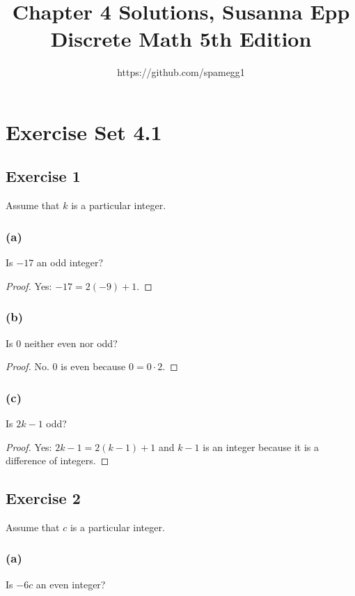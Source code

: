 \documentclass[14pt]{extarticle}
\title{Chapter 4 Solutions, Susanna Epp Discrete Math 5th Edition}
\author{https://github.com/spamegg1}
\begin{document}
\maketitle
\tableofcontents

\section{Exercise Set 4.1}

\subsection{Exercise 1}
Assume that $k$ is a particular integer.

\subsubsection{(a)}
Is $-17$ an odd integer?

\begin{proof}
Yes: $-17 = 2(-9) + 1$.

\end{proof}

\subsubsection{(b)}
Is 0 neither even nor odd?

\begin{proof}
No. 0 is even because $0 = 0 \cdot 2$.
\end{proof}

\subsubsection{(c)}
Is $2k - 1$ odd?

\begin{proof}
Yes: $2k - 1 = 2(k - 1) + 1$ and $k - 1$ is an integer because it is a difference of integers.
\end{proof}

\subsection{Exercise 2}
Assume that $c$ is a particular integer.

\subsubsection{(a)}
Is $-6c$ an even integer?
\end{document}
